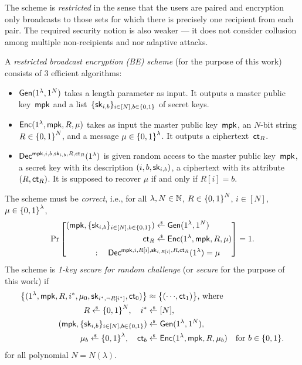 The scheme is \emph{restricted} in the sense that the users are paired and encryption only broadcasts to those sets for which there is precisely one recipient from each pair.
The required security notion is also weaker --- it does not consider collusion among multiple non-recipients and nor adaptive attacks.

\begin{definition}
A \emph{restricted broadcast encryption (BE) scheme} (for the purpose of this work) consists of 3 efficient algorithms:
\begin{itemize}
\item $\Gen(1^\lambda,1^N)$ takes a length parameter as input.
It outputs a master public key~$\mpk$ and
a list~$\{\sk_{i,b}\}_{i\in[N],b\in\bit}$ of secret keys.
\item $\Enc(1^\lambda,\mpk,R,\mu)$ takes as input
the master public key~$\mpk$,
an $N$-bit string ${R\in{\{0,1\}}^N}$, and
a message ${\mu\in{\{0,1\}}^\lambda}$.
It outputs a ciphertext~$\ct_R$.
\item $\Dec^{\mpk,i,b,\sk_{i,b},R,\ct_R}(1^\lambda)$
is given random access to
the master public key~$\mpk$,
a secret key with its description $(i,b,\sk_{i,b})$,
a ciphertext with its attribute $(R,\ct_R)$.
It is supposed to recover $\mu$ if and only if ${R[i]=b}$.
\end{itemize}
The scheme must be \emph{correct}, i.e., for all
${\lambda,N\in{\mathbb{N}}}$,
${R\in{\{0,1\}}^N}$,
${i\in[N]}$,
${\mu\in{\{0,1\}}^\lambda}$,
\begin{align*}
\Pr\left[\begin{aligned}
(\mpk,\{\sk_{i,b}\}_{i\in[N],b\in\bit})
&{}
\draws\Gen(1^\lambda,1^N)
\\
\ct_R
&{}
\draws\Enc(1^\lambda,\mpk,R,\mu)
\\
:\quad
\Dec^{\mpk,i,R[i],\sk_{i,R[i]},R,\ct_R}
(1^\lambda)=\mu
\hspace*{-8em}
&
\end{aligned}
\right]
=1.
\end{align*}
The scheme is \emph{1-key secure for random challenge} (or \emph{secure} for the purpose of this work) if
\begin{align*}
\bigl\{(1^\lambda,\mpk,R,i^\ast,\mu_0,\sk_{i^\ast,\neg R[i^\ast]},\ct_0)\bigr\}
&{}\approx
\bigl\{({\cdots},\ct_1)\bigr\}
\textup{, where}\\
R\draws\bit^N,\quad
i^\ast&{}\draws[N],\\
(\mpk,\{\sk_{i,b}\}_{i\in[N],b\in\bit})
&{}\draws\Gen(1^\lambda,1^N),\\
\mu_b\draws\bit^\lambda,\quad
\ct_b&{}\draws\Enc(1^\lambda,\mpk,R,\mu_b)
\quad\textup{for }b\in\bit.
\end{align*}
for all polynomial ${N=N(\lambda)}$.
\end{definition}
